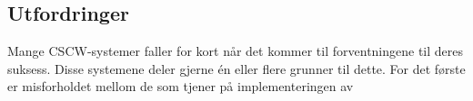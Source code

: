 \subsection{Utfordringer}
\label{chp: utfordringer}

Mange CSCW-systemer faller for kort når det kommer til forventningene til deres suksess\cite{Grundin88}. Disse systemene deler gjerne én eller flere grunner til dette. For det første er misforholdet mellom de som tjener på implementeringen av  
